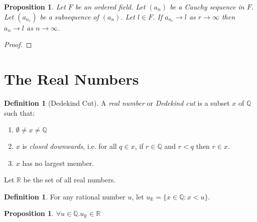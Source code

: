 \documentclass{article}
\let\qed\relax
\newtheorem{proposition}[axiom]{Proposition}
\theoremstyle{definition}
\newtheorem{definition}[axiom]{Definition}
\begin{document}
    \begin{proposition}
        \label{proposition:Cauchy_subsequence_converges}
        Let $F$ be an ordered field. Let $(a_n)$ be a Cauchy sequence in $F$. Let $(a_{n_r})$ be a
        subsequence of $(a_n)$. Let $l \in F$. If $a_{n_r} \rightarrow l$ as $r \rightarrow \infty$
        then $a_n \rightarrow l$ as $n \rightarrow \infty$.
    \end{proposition}

    \begin{proof}
        \pf
        \qed
    \end{proof}
    \section{The Real Numbers}

    \begin{definition}[Dedekind Cut]
        A \emph{real number} or \emph{Dedekind cut} is a subset $x$ of $\mathbb{Q}$ such that:
        \begin{enumerate}
            \item $\emptyset \neq x \neq \mathbb{Q}$
            \item $x$ is \emph{closed downwards}, i.e. for all $q \in x$, if $r \in \mathbb{Q}$
            and $r < q$ then $r \in x$.
            \item $x$ has no largest member.
        \end{enumerate}
        Let $\mathbb{R}$ be the set of all real numbers.
    \end{definition}

    \begin{definition}
        For any rational number $u$, let $u_\mathbb{R} = \{ x \in \mathbb{Q} : x < u \}$.
    \end{definition}

    \begin{proposition}
        $\forall u \in \mathbb{Q}. u_\mathbb{R} \in \mathbb{R}$
    \end{proposition}
\end{document}
